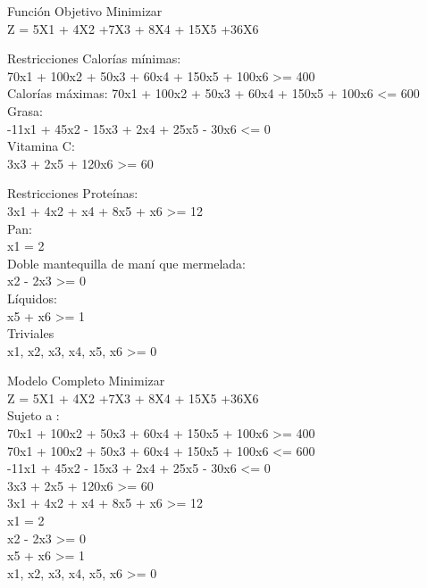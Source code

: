 \documentclass{beamer}
\begin{document}
\begin{frame}[fragile]{Función Objetivo}
Minimizar\\
Z = 5X1 + 4X2 +7X3 + 8X4 + 15X5 +36X6\\
\end{frame}

\begin{frame}[fragile]{Restricciones}
Calorías mínimas:\\
70x1 + 100x2 + 50x3 + 60x4 + 150x5 + 100x6 >= 400\\
Calorías máximas:
70x1 + 100x2 + 50x3 + 60x4 + 150x5 + 100x6 <= 600\\
Grasa:\\
-11x1 + 45x2 - 15x3 + 2x4 + 25x5 - 30x6  <=  0\\
Vitamina C:\\
3x3 + 2x5 + 120x6 >= 60\\
\end{frame}
\begin{frame}[fragile]{Restricciones}
Proteínas:\\
3x1 + 4x2 + x4 + 8x5 + x6 >= 12\\
Pan:\\
x1 = 2\\
Doble mantequilla de maní que mermelada:\\
x2 - 2x3 >= 0\\
Líquidos:\\
x5 + x6 >= 1 \\
Triviales\\
x1, x2, x3, x4, x5, x6 >= 0\\

\end{frame}

\begin{frame}[fragile]{Modelo Completo}
Minimizar\\
Z = 5X1 + 4X2 +7X3 + 8X4 + 15X5 +36X6\\
Sujeto a :\\
70x1 + 100x2 + 50x3 + 60x4 + 150x5 + 100x6 >= 400\\
70x1 + 100x2 + 50x3 + 60x4 + 150x5 + 100x6 <= 600\\
-11x1 + 45x2 - 15x3 + 2x4 + 25x5 - 30x6  <=  0\\
3x3 + 2x5 + 120x6 >= 60\\
3x1 + 4x2 + x4 + 8x5 + x6 >= 12\\
x1 = 2\\
x2 - 2x3 >= 0\\
x5 + x6 >= 1 \\
x1, x2, x3, x4, x5, x6 >= 0\\

\end{frame}
\end{document}
